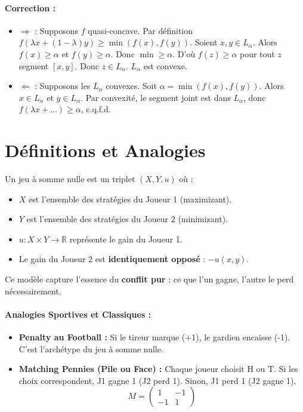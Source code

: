 \paragraph{Correction :}
\begin{itemize}
    \item $\Rightarrow$ : Supposons $f$ quasi-concave. Par définition $f(\lambda x + (1-\lambda)y) \ge \min(f(x), f(y))$.
    Soient $x, y \in L_\alpha$. Alors $f(x) \ge \alpha$ et $f(y) \ge \alpha$. Donc $\min \ge \alpha$.
    D'où $f(z) \ge \alpha$ pour tout $z$ segment $[x,y]$. Donc $z \in L_\alpha$. $L_\alpha$ est convexe.
    \item $\Leftarrow$ : Supposons les $L_\alpha$ convexes.
    Soit $\alpha = \min(f(x), f(y))$. Alors $x \in L_\alpha$ et $y \in L_\alpha$.
    Par convexité, le segment joint est dans $L_\alpha$, donc $f(\lambda x + \dots) \ge \alpha$, c.q.f.d.
\end{itemize}

\section{Définitions et Analogies}

\begin{definition}
Un jeu à somme nulle est un triplet $(X, Y, u)$ où :
\begin{itemize}
    \item $X$ est l'ensemble des stratégies du Joueur 1 (maximizant).
    \item $Y$ est l'ensemble des stratégies du Joueur 2 (minimizant).
    \item $u: X \times Y \rightarrow \mathbb{R}$ représente le gain du Joueur 1.
    \item Le gain du Joueur 2 est \textbf{identiquement opposé} : $-u(x, y)$.
\end{itemize}
Ce modèle capture l'essence du \textbf{conflit pur} : ce que l'un gagne, l'autre le perd nécessairement.
\end{definition}

\paragraph{Analogies Sportives et Classiques :}
\begin{itemize}
    \item \textbf{Penalty au Football :} Si le tireur marque (+1), le gardien encaisse (-1). C'est l'archétype du jeu à somme nulle.
    \item \textbf{Matching Pennies (Pile ou Face) :} Chaque joueur choisit H ou T. Si les choix correspondent, J1 gagne 1 (J2 perd 1). Sinon, J1 perd 1 (J2 gagne 1).
    $$M = \begin{pmatrix} 1 & -1 \\ -1 & 1 \end{pmatrix}$$
\end{itemize}

